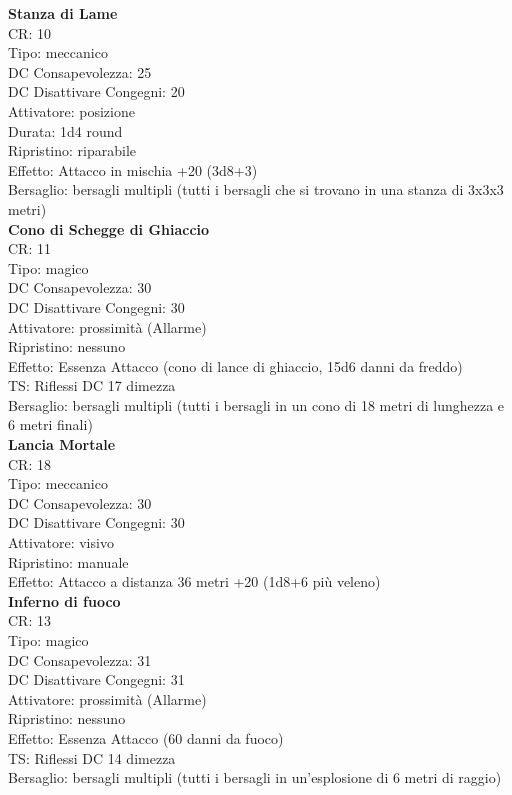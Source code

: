 \documentclass[a4paper,11pt,twoside,openany]{book}
\begin{document}
{\begin{multicols}{2}
\textbf{Stanza di Lame}\\
CR: 10 \\
Tipo: meccanico \\
DC Consapevolezza: 25 \\
DC Disattivare Congegni: 20 \\
Attivatore: posizione \\
Durata: 1d4 round \\
Ripristino: riparabile \\
Effetto: Attacco in mischia +20 (3d8+3) \\
Bersaglio: bersagli multipli (tutti i bersagli che si trovano in una stanza di 3x3x3 metri)\\

\textbf{Cono di Schegge di Ghiaccio}\\
CR: 11 \\
Tipo: magico \\
DC Consapevolezza: 30 \\
DC Disattivare Congegni: 30 \\
Attivatore: prossimità (Allarme) \\
Ripristino: nessuno \\
Effetto: Essenza Attacco (cono di lance di ghiaccio, 15d6 danni da freddo) \\
TS: Riflessi DC 17 dimezza \\
Bersaglio: bersagli multipli (tutti i bersagli in un cono di 18 metri di lunghezza e 6 metri finali)\\

\textbf{Lancia Mortale}\\
CR: 18 \\
Tipo: meccanico \\
DC Consapevolezza: 30 \\
DC Disattivare Congegni: 30 \\
Attivatore: visivo\\
Ripristino: manuale \\
Effetto: Attacco a distanza 36 metri +20 (1d8+6 più veleno)\\

\textbf{Inferno di fuoco}\\
CR: 13 \\
Tipo: magico \\
DC Consapevolezza: 31 \\
DC Disattivare Congegni: 31 \\
Attivatore: prossimità (Allarme) \\
Ripristino: nessuno \\
Effetto: Essenza Attacco (60 danni da fuoco) \\
TS: Riflessi DC 14 dimezza \\
Bersaglio: bersagli multipli (tutti i bersagli in un’esplosione di 6 metri di raggio)\\


\end{multicols}}
\end{document}
